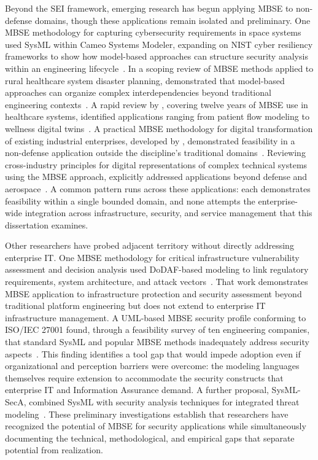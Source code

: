 Beyond the SEI framework, emerging research has begun applying MBSE to non-defense domains, though these applications remain isolated and preliminary. One MBSE methodology for capturing cybersecurity requirements in space systems used SysML within Cameo Systems Modeler, expanding on NIST cyber resiliency frameworks to show how model-based approaches can structure security analysis within an engineering lifecycle~\parencite{Gordon_Reilly_2023}. In a scoping review of MBSE methods applied to rural healthcare system disaster planning, \citeauthor{Berg_2023} demonstrated that model-based approaches can organize complex interdependencies beyond traditional engineering contexts~\parencite{Berg_2023}. A rapid review by \citeauthor{Xames_2024}, covering twelve years of MBSE use in healthcare systems, identified applications ranging from patient flow modeling to wellness digital twins~\parencite{Xames_2024}. A practical MBSE methodology for digital transformation of existing industrial enterprises, developed by \citeauthor{Badenko_2024}, demonstrated feasibility in a non-defense application outside the discipline's traditional domains~\parencite{Badenko_2024}. Reviewing cross-industry principles for digital representations of complex technical systems using the MBSE approach, \citeauthor{Bolshakov_2023} explicitly addressed applications beyond defense and aerospace~\parencite{Bolshakov_2023}. A common pattern runs across these applications: each demonstrates feasibility within a single bounded domain, and none attempts the enterprise-wide integration across infrastructure, security, and service management that this dissertation examines.

Other researchers have probed adjacent territory without directly addressing enterprise IT\@. One MBSE methodology for critical infrastructure vulnerability assessment and decision analysis used DoDAF-based modeling to link regulatory requirements, system architecture, and attack vectors~\parencite{Huff_Medal_2019}. That work demonstrates MBSE application to infrastructure protection and security assessment beyond traditional platform engineering but does not extend to enterprise IT infrastructure management. A UML-based MBSE security profile conforming to ISO/IEC 27001 found, through a feasibility survey of ten engineering companies, that standard SysML and popular MBSE methods inadequately address security aspects~\parencite{Mazeika_Butleris_2020}. This finding identifies a tool gap that would impede adoption even if organizational and perception barriers were overcome: the modeling languages themselves require extension to accommodate the security constructs that enterprise IT and Information Assurance demand. A further proposal, SysML-SecA, combined SysML with security analysis techniques for integrated threat modeling~\parencite{Apvrille_Roudier_2015}. These preliminary investigations establish that researchers have recognized the potential of MBSE for security applications while simultaneously documenting the technical, methodological, and empirical gaps that separate potential from realization.

